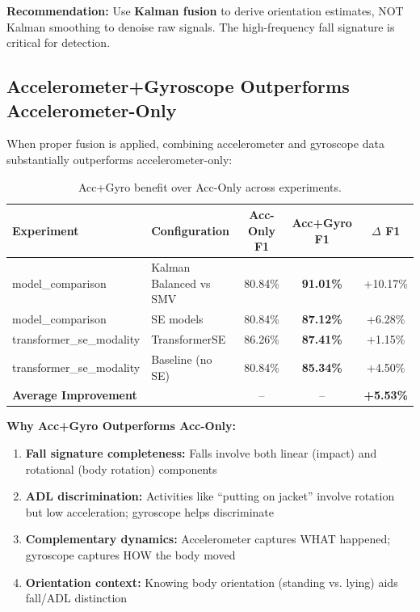 \documentclass{article}
\begin{document}
\textbf{Recommendation:} Use \textbf{Kalman fusion} to derive orientation estimates, NOT Kalman smoothing to denoise raw signals. The high-frequency fall signature is critical for detection.

\subsection{Accelerometer+Gyroscope Outperforms Accelerometer-Only}

When proper fusion is applied, combining accelerometer and gyroscope data substantially outperforms accelerometer-only:

\begin{table}[htbp]
    \centering
    \caption{Acc+Gyro benefit over Acc-Only across experiments.}
    \label{tab:accgyro_evidence}
    \small
    \begin{tabular}{llccc}
        \toprule
        \textbf{Experiment} & \textbf{Configuration} & \textbf{Acc-Only F1} & \textbf{Acc+Gyro F1} & \textbf{$\Delta$ F1} \\
        \midrule
        model\_comparison & Kalman Balanced vs SMV & 80.84\% & \textbf{91.01\%} & +10.17\% \\
        model\_comparison & SE models & 80.84\% & \textbf{87.12\%} & +6.28\% \\
        transformer\_se\_modality & TransformerSE & 86.26\% & \textbf{87.41\%} & +1.15\% \\
        transformer\_se\_modality & Baseline (no SE) & 80.84\% & \textbf{85.34\%} & +4.50\% \\
        \midrule
        \multicolumn{2}{l}{\textbf{Average Improvement}} & -- & -- & \textbf{+5.53\%} \\
        \bottomrule
    \end{tabular}
\end{table}

\textbf{Why Acc+Gyro Outperforms Acc-Only:}
\begin{enumerate}
    \item \textbf{Fall signature completeness:} Falls involve both linear (impact) and rotational (body rotation) components
    \item \textbf{ADL discrimination:} Activities like ``putting on jacket'' involve rotation but low acceleration; gyroscope helps discriminate
    \item \textbf{Complementary dynamics:} Accelerometer captures WHAT happened; gyroscope captures HOW the body moved
    \item \textbf{Orientation context:} Knowing body orientation (standing vs. lying) aids fall/ADL distinction
\end{enumerate}
\end{document}
